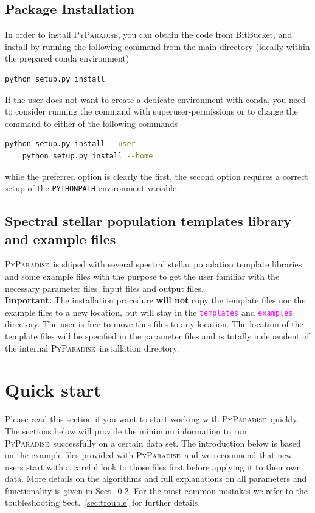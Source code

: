 \documentclass[usenatbib,usegraphicx,useAMS,onecolumn]{mn2e}
\newcommand{\codeline}[1]{\lstinline|#1|}
\newcommand{\fname}[1]{\textcolor{magenta}{\codeline{#1}}}
\newcommand{\PyPar}{\mbox{\textsc{PyParadise}}}
\begin{document}
\subsection{Package Installation}
In order to install \PyPar, you can obtain the code from BitBucket, and install by running the following command from the main directory (ideally within the prepared conda environment)
\begin{lstlisting}[language=sh]
    python setup.py install
\end{lstlisting}
If the user does not want to create a dedicate environment with conda, you need to consider running the command with superuser-permissions or to change the command to either of the following commands
\begin{lstlisting}[language=sh]
    python setup.py install --user
    python setup.py install --home
\end{lstlisting}
while the preferred option is clearly the first, the second option requires a correct setup of the \codeline{PYTHONPATH} environment variable.

\subsection{Spectral stellar population templates library and example files}
\PyPar\ is shiped with several spectral stellar population template libraries and some example files with the purpose to get the user familiar with the necessary parameter files, input files and output files. \bigskip\\
\textbf{Important:} The installation procedure \textbf{will not} copy the template files nor the example files to a new location, but will stay in the \fname{templates} and \fname{examples} directory. The user is free to move thes files to any location. The location of the template files will be specified in the parameter files and is totally independent of the internal \PyPar\ installation directory.

\section{Quick start}\label{sec:quickstart}
Please read this section if you want to start working with \PyPar\ quickly. The sections below will provide the minimum information to run \PyPar\ successfully on a certain data set. The introduction below is based on the example files provided with \PyPar\ and we recommend that new users start with a careful look to those files first before applying it to their own data. More details on the algorithms and full explanations on all parameters and functionality is given in Sect.~\ref{}. For the most common mistakes we refer to the toubleshooting Sect.~\ref{sec:trouble} for further details.
\end{document}
